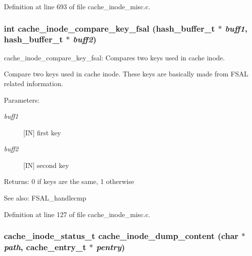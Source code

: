 Definition at line 693 of file cache\_\-inode\_\-misc.c.
\subsubsection[{cache\_\-inode\_\-compare\_\-key\_\-fsal}]{\setlength{\rightskip}{0pt plus 5cm}int cache\_\-inode\_\-compare\_\-key\_\-fsal (hash\_\-buffer\_\-t $\ast$ {\em buff1}, \/  hash\_\-buffer\_\-t $\ast$ {\em buff2})}\label{cache__inode__misc_8c_b2ed61f21523805c300eae3d843ada57}


cache\_\-inode\_\-compare\_\-key\_\-fsal: Compares two keys used in cache inode.

Compare two keys used in cache inode. These keys are basically made from FSAL related information.

\begin{Desc}
\item[Parameters:]
\begin{description}
\item[{\em buff1}][IN] first key \item[{\em buff2}][IN] second key \end{description}
\end{Desc}
\begin{Desc}
\item[Returns:]0 if keys are the same, 1 otherwise\end{Desc}
\begin{Desc}
\item[See also:]FSAL\_\-handlecmp \end{Desc}


Definition at line 127 of file cache\_\-inode\_\-misc.c.
\subsubsection[{cache\_\-inode\_\-dump\_\-content}]{\setlength{\rightskip}{0pt plus 5cm}cache\_\-inode\_\-status\_\-t cache\_\-inode\_\-dump\_\-content (char $\ast$ {\em path}, \/  cache\_\-entry\_\-t $\ast$ {\em pentry})}\label{cache__inode__misc_8c_d4bd35e3d32d663afea3499d1a29199e}


